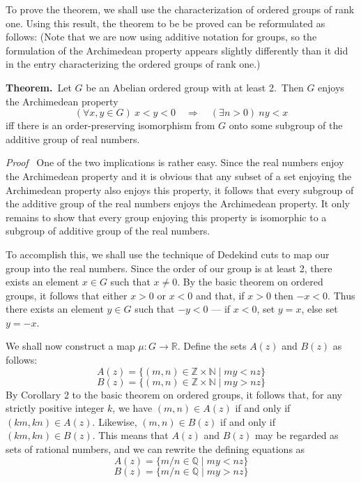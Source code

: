 \documentclass[12pt]{article}
\begin{document}
To prove the theorem, we shall use the characterization of ordered groups of rank one.  Using this result, the theorem to be be proved can be reformulated as follows:  (Note that we are now using additive notation for groups, so the formulation of the Archimedean property appears slightly differently than it did in the entry characterizing the ordered groups of rank one.)

\textbf{Theorem.} \,Let $G$ be an Abelian ordered group with  at least 2. \,Then $G$ enjoys the Archimedean property
 $$(\forall x,y \in G) \> x < y < 0 \quad \Rightarrow \quad (\exists n > 0) \> ny < x$$
 iff there is an order-preserving isomorphism from $G$ onto some subgroup of the additive group of real numbers.

{\it Proof} \, One of the two implications is rather easy.  Since the real numbers enjoy the Archimedean property and it is obvious that any subset of a set enjoying the Archimedean property also enjoys this property, it follows that every subgroup of the additive group of the real numbers enjoys the Archimedean property.  It only remains to show that every group enjoying this property is isomorphic to a subgroup of additive group of the real numbers.

To accomplish this, we shall use the technique of Dedekind cuts to map our group into the real numbers.  Since the order of our group is at least 2, there exists an element $x \in G$ such that $x \neq 0$.  By the basic theorem on ordered groups, it follows that either $x > 0$ or $x < 0$ and that, if $x > 0$ then $-x < 0$.  Thus there exists an element $y \in G$ such that $-y < 0$ --- if $x < 0$, set $y = x$, else set $y = -x$.

We shall now construct a map $\mu \colon G \to \mathbb{R}$.  Define the sets $A(z)$ and $B(z)$ as follows:
 $$A(z) = \{ (m,n) \in \mathbb{Z} \times \mathbb{N} \mid my < nz \}$$
 $$B(z) = \{ (m,n) \in \mathbb{Z} \times \mathbb{N} \mid my > nz \}$$
By Corollary 2 to the basic theorem on ordered groups, it follows that, for any strictly positive integer $k$, we have $(m,n) \in A(z)$ if and only if $(km,kn) \in A(z)$.  Likewise, $(m,n) \in B(z)$ if and only if $(km,kn) \in B(z)$.  This means that $A(z)$ and $B(z)$ may be regarded as sets of rational numbers, and we can rewrite the defining equations as
 $$A(z) = \{ m/n \in \mathbb{Q} \mid my < nz \}$$
 $$B(z) = \{ m/n \in \mathbb{Q} \mid my > nz \}$$
\end{document}
